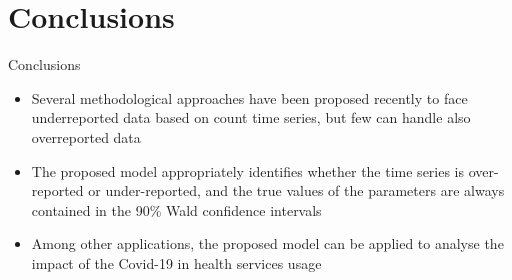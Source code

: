 \documentclass[aspectratio=169,usepdftitle=true]{beamer}
\newcommand\twosplit[3][t]{%
\begin{columns}[#1]
\begin{column}{0.475\linewidth}#2\end{column}\hfill
\begin{column}{0.475\linewidth}#3\end{column}
\end{columns}}
\begin{document}
\section{Conclusions}

\begin{frame}{Conclusions}
\begin{itemize}
 \item Several methodological approaches have been proposed recently to face underreported data based on count time series, but few can handle also overreported data
 \item The proposed model appropriately identifies whether the time series is over-reported or under-reported, and the true values of the parameters are always contained in the 90\% Wald confidence intervals
 \item Among other applications, the proposed model can be applied to analyse the impact of the Covid-19 in health services usage
\end{itemize}
\end{frame}

\end{document}
